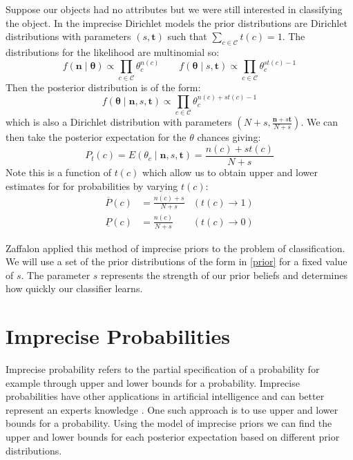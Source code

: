 Suppose our objects had no attributes but we were still interested in classifying the object.
In the imprecise Dirichlet models the prior distributions are Dirichlet distributions with parameters $(s, \mathbf{t})$ such that $\sum_{c \in \mathcal{C}} t(c) = 1$.
The distributions for the likelihood are multinomial so:
\begin{equation}
	f(\mathbf{n} \mid \mathbf{\theta}) \propto \prod_{c \in \mathcal{C}} \theta_c^{n(c)}
	\qquad
	f(\mathbf{\theta} \mid s, \mathbf{t}) \propto \prod_{c \in \mathcal{C}} \theta_c^{st(c) - 1}
\end{equation}
Then the posterior distribution is of the form:
\begin{equation} \label{dirichlet_pdf2}
	f(\mathbf{\theta} \mid \mathbf{n}, s, \mathbf{t}) \propto \prod_{c \in \mathcal{C}} \theta_c^{n(c) + st(c) - 1}
\end{equation}
which is also a Dirichlet distribution with parameters $(N+s, \frac{\mathbf{n}+s\mathbf{t}}{N+s})$.
We can then take the posterior expectation for the $\theta$ chances giving:
\begin{equation}
	P_t(c) = E(\theta_c \mid \mathbf{n}, s, \mathbf{t}) = \frac{n(c)+st(c)}{N+s}
\end{equation}
Note this is a function of $t(c)$ which allow us to obtain upper and lower estimates for for probabilities by varying $t(c)$:
\begin{align}
	\overline{P}(c) & = \frac{n(c)+s}{N+s} & (t(c) \rightarrow 1) \\
	\underline{P}(c) & = \frac{n(c)}{N+s}  & (t(c) \rightarrow 0)
\end{align}

Zaffalon applied this method of imprecise priors to the problem of classification.
We will use a set of the prior distributions of the form in \cref{prior} for a fixed value of $s$.
The parameter $s$ represents the strength of our prior beliefs and determines how quickly our classifier learns.

\section{Imprecise Probabilities}

Imprecise probability refers to the partial specification of a probability for example through upper and lower bounds for a probability.
Imprecise probabilities have other applications in artificial intelligence and can better represent an experts knowledge \cite{Coolen11}.
One such approach is to use upper and lower bounds for a probability.
Using the model of imprecise priors we can find the upper and lower bounds for each posterior expectation based on different prior distributions.


